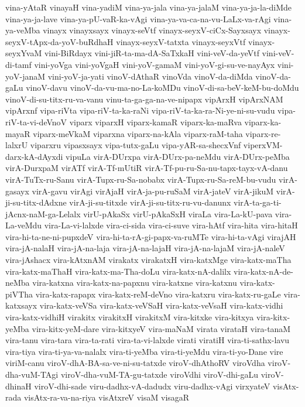 {vina-yAtaR
vinayaH
vina-yadiM
vina-ya-jala
vina-ya-jalaM
vina-ya-ja-la-diMde
vina-ya-ja-lave
vina-ya-pU-vaR-ka-vAgi
vina-ya-va-ca-na-vu-LaLx-va-rAgi
vina-ya-veMba
vinayx
vinayxsayx
vinayx-seVtf
vinayx-seyxV-ciCx-Sayxsayx
vinayx-seyxV-tApx-da-yoV-buRdhaH
vinayx-seyxV-tatxta
vinayx-seyxVtf
vinayx-seyxYvaM
vini-BiRdayx
vini-jiR-ta-ma-dA-SaTxkaH
vini-veV-da-yeVtf
vini-veV-di-tamf
vini-yoVga
vini-yoVgaH
vini-yoV-gamaM
vini-yoV-gi-su-ve-nayAyx
vini-yoV-janaM
vini-yoV-ja-yati
vinoV-dAthaR
vinoVda
vinoV-da-diMda
vinoV-da-gaLu
vinoV-davu
vinoV-da-vu-ma-no-La-koMDu
vinoV-di-sa-beV-keM-bu-doMdu
vinoV-di-su-titx-ru-va-vanu
vinu-ta-ga-ga-na-ve-nipapx
vipArxH
vipArxNAM
vipArxnf
vipa-riVta
vipa-riV-ta-ka-raNi
vipa-riV-ta-ka-ra-Ni-ye-ni-su-vudu
vipa-riV-ta-vi-deVnoV
viparx
viparxH
viparx-kamaR
viparx-ka-maRva
viparx-ka-mayaR
viparx-meVkaM
viparxna
viparx-na-kAla
viparx-raM-taha
viparx-re-lalxrU
viparxru
vipasxsayx
vipa-tutx-gaLu
vipa-yAR-sa-shecxVnf
viperxVM-darx-kA-dAyxdi
vipuLa
virA-DUrxpa
virA-DUrx-pa-neMdu
virA-DUrx-peMba
virA-DurxpaM
virATf
virA-Tf-mUtiR
virA-Tf-pu-ru-Sa-nu-tapx-tayx-vA-danu
virA-TuTx-ru-Sanu
virA-Tupx-ru-Sa-nobabx
virA-Tupx-ru-Sa-reM-bu-vudu
virA-gasayx
virA-gavu
virAgi
virAjaH
virA-ja-pu-ruSaM
virA-jateV
virA-jikuM
virA-ji-su-titx-dAdxne
virA-ji-su-titxde
virA-ji-su-titx-ru-vu-danunx
virA-ta-ga-ti-jAcnx-naM-ga-Lelalx
virU-pAkaSx
virU-pAkaSxH
viraLa
vira-La-kU-pava
vira-La-veMdu
vira-La-vi-lalxde
vira-ci-sida
vira-ci-suve
vira-hAtf
vira-hita
vira-hitaH
vira-hi-ta-ne-ni-pupxdeV
vira-hi-ta-rA-gi-papx-va-ruMTe
vira-hi-ta-vAgi
virajAH
vira-jA-nalaH
vira-jA-na-laja
vira-jA-na-lajaH
vira-jA-na-lajaM
vira-jA-naleV
vira-jAshacx
vira-kAtxnAM
virakatx
virakatxH
vira-katxMge
vira-katx-maTha
vira-katx-maThaH
vira-katx-ma-Tha-doLu
vira-katx-nA-dalilx
vira-katx-nA-de-neMba
vira-katxna
vira-katx-na-papxnu
vira-katxne
vira-katxnu
vira-katx-piVTha
vira-katx-rapapx
vira-katx-reM-deVno
vira-katxru
vira-katx-ru-gaLe
vira-katxsayx
vira-katx-veVSa
vira-katx-veVSaH
vira-katx-veVsaH
vira-katx-vidhi
vira-katx-vidhiH
virakitx
virakitxH
virakitxM
vira-kitxke
vira-kitxya
vira-kitx-yeMba
vira-kitx-yeM-dare
vira-kitxyeV
vira-maNaM
virata
virataH
vira-tanaM
vira-tanu
vira-tara
vira-ta-rati
vira-ta-vi-lalxde
virati
viratiH
vira-ti-sathx-lavu
vira-tiya
vira-ti-ya-va-nalalx
vira-ti-yeMba
vira-ti-yeMdu
vira-ti-yo-Dane
vire
viriM-canu
viroV-dhA-BA-sa-ve-ni-su-tatxde
viroV-dhAthoRV
viroVdha
viroV-dha-vuM-TAgi
viroV-dha-vuM-TA-gu-tatxde
viroVdhi
viroV-dhi-gaLu
viroV-dhinaH
viroV-dhi-sade
viru-dadhx-vA-dadudx
viru-dadhx-vAgi
virxyateV
visAtx-rada
visAtx-ra-va-na-riya
visAtxreV
visaM
visagaR
}
